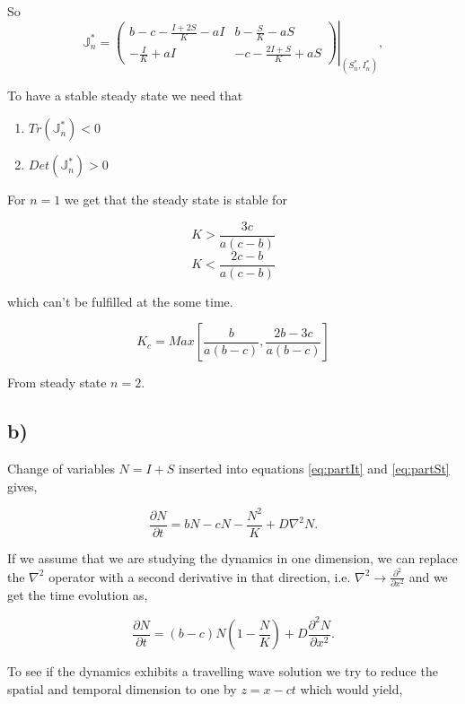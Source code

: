 So
\begin{equation}
\mathbb{J}^*_n=\left.\left(
\begin{array}{cc}
b-c-\frac{I+2S}{K}-aI & b-\frac{S}{K}-aS \\
-\frac{I}{K} +aI & -c -\frac{2I+S}{K}+aS
\end{array}\right)\right|_{(S^*_n,I^*_n)},
\end{equation}

To have a stable steady state we need that 

\begin{enumerate}
\item $Tr(\mathbb{J}^*_n)<0$
\item $Det(\mathbb{J}^*_n)>0$
\end{enumerate}


For $n=1$ we get that the steady state is stable for

$$
K>\frac{3c}{a(c-b)}
$$$$
K<\frac{2c-b}{a(c-b)}
$$

which can't be fulfilled at the some time.


\begin{equation}
K_c=Max\left[\frac{b}{a(b-c)},\frac{2b-3c}{a(b-c)}\right]
\end{equation}

From steady state $n=2$.
\subsection{b)}

Change of variables $N=I+S$ inserted into equations \eqref{eq:partIt} and \eqref{eq:partSt} gives,

\begin{equation}
\frac{\partial N}{\partial t}=bN -cN -\frac{N^2}{K}+D\nabla^2N.
\end{equation}

If we assume that we are studying the dynamics in one dimension, we can replace the $\nabla^2$ operator with a second derivative in that direction, i.e. $\nabla^2\rightarrow \frac{\partial^2}{\partial x^2}$ and we get the time evolution as,

\begin{equation}
\frac{\partial N}{\partial t}=(b-c)N\left(1-\frac{N}{K}\right)+D\frac{\partial^2 N}{\partial x^2}.
\end{equation}

To see if the dynamics exhibits a travelling wave solution we try to reduce the spatial and temporal dimension to one by $z=x-ct$ which would yield,


